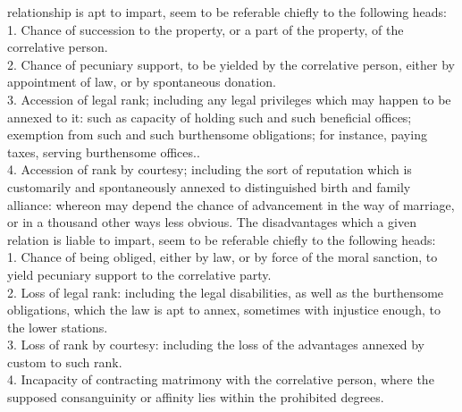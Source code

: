 \documentclass[12pt]{report}
\begin{document}
relationship is apt to impart, seem to be referable chiefly to the
following heads:\\
1. Chance of succession to the property, or a part of the property, of
the correlative person.\\
2. Chance of pecuniary support, to be yielded by the correlative person,
either by appointment of law, or by spontaneous donation.\\
3. Accession of legal rank; including any legal privileges which may
happen to be annexed to it: such as capacity of holding such and such
beneficial offices; exemption from such and such burthensome
obligations; for instance, paying taxes, serving burthensome offices..\\
4. Accession of rank by courtesy; including the sort of reputation which
is customarily and spontaneously annexed to distinguished birth and
family alliance: whereon may depend the chance of advancement in the way
of marriage, or in a thousand other ways less obvious. The disadvantages
which a given relation is liable to impart, seem to be referable chiefly
to the following heads:\\
1. Chance of being obliged, either by law, or by force of the moral
sanction, to yield pecuniary support to the correlative party.\\
2. Loss of legal rank: including the legal disabilities, as well as the
burthensome obligations, which the law is apt to annex, sometimes with
injustice enough, to the lower stations.\\
3. Loss of rank by courtesy: including the loss of the advantages
annexed by custom to such rank.\\
4. Incapacity of contracting matrimony with the correlative person,
where the supposed consanguinity or affinity lies within the prohibited
degrees.
\end{document}
